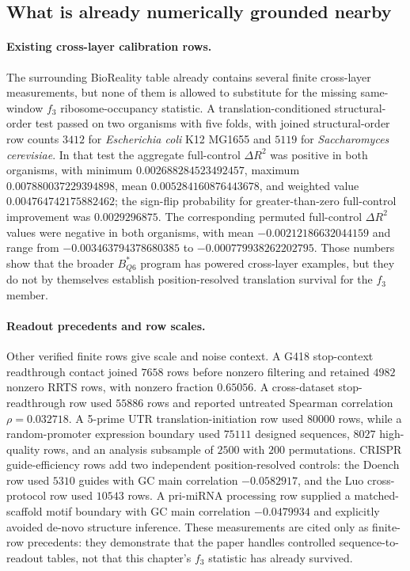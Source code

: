 \subsection{What is already numerically grounded nearby}
\label{sec:q6-f3-stress-nearby-grounding}

\paragraph{Existing cross-layer calibration rows.}
The surrounding BioReality table already contains several finite cross-layer measurements, but none of them is allowed to substitute for the missing same-window $f_3$ ribosome-occupancy statistic.  A translation-conditioned structural-order test passed on two organisms with five folds, with joined structural-order row counts $3412$ for \textit{Escherichia coli} K12 MG1655 and $5119$ for \textit{Saccharomyces cerevisiae}.  In that test the aggregate full-control $\Delta R^2$ was positive in both organisms, with minimum $0.002688284523492457$, maximum $0.007880037229394898$, mean $0.005284160876443678$, and weighted value $0.004764742175882462$; the sign-flip probability for greater-than-zero full-control improvement was $0.0029296875$.  The corresponding permuted full-control $\Delta R^2$ values were negative in both organisms, with mean $-0.00212186632044159$ and range from $-0.003463794378680385$ to $-0.000779938262202795$.  Those numbers show that the broader $B^\ast_{Q6}$ program has powered cross-layer examples, but they do not by themselves establish position-resolved translation survival for the $f_3$ member.

\paragraph{Readout precedents and row scales.}
Other verified finite rows give scale and noise context.  A G418 stop-context readthrough contact joined $7658$ rows before nonzero filtering and retained $4982$ nonzero RRTS rows, with nonzero fraction $0.65056$.  A cross-dataset stop-readthrough row used $55886$ rows and reported untreated Spearman correlation $\rho=0.032718$.  A 5-prime UTR translation-initiation row used $80000$ rows, while a random-promoter expression boundary used $75111$ designed sequences, $8027$ high-quality rows, and an analysis subsample of $2500$ with $200$ permutations.  CRISPR guide-efficiency rows add two independent position-resolved controls: the Doench row used $5310$ guides with GC main correlation $-0.0582917$, and the Luo cross-protocol row used $10543$ rows.  A pri-miRNA processing row supplied a matched-scaffold motif boundary with GC main correlation $-0.0479934$ and explicitly avoided de-novo structure inference.  These measurements are cited only as finite-row precedents: they demonstrate that the paper handles controlled sequence-to-readout tables, not that this chapter's $f_3$ statistic has already survived.
